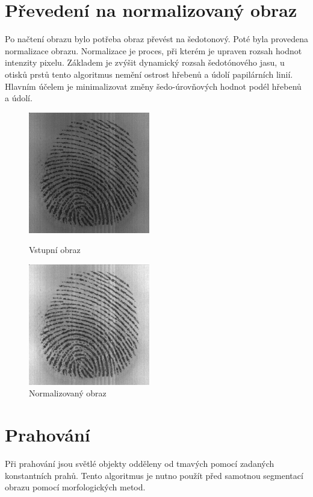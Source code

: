 \section{Převedení na normalizovaný obraz}
Po načtení obrazu bylo potřeba obraz převést na šedotonový. Poté byla provedena normalizace obrazu. Normalizace je proces, při kterém je upraven rozsah hodnot intenzity pixelu. Základem je zvýšit dynamický rozsah šedotónového jasu, u otisků prstů tento algoritmus nemění ostrost hřebenů a údolí papilárních linií. Hlavním účelem je minimalizovat změny šedo-úrovňových hodnot podél hřebenů a údolí. 

\begin{figure}[htbp]
  \begin{minipage}[b]{0.5\linewidth}
    \centering
    \includegraphics[width=200px]{obrazky-figures/102_1.png}
    \caption{Vstupní obraz}
  \end{minipage}
  \hspace{0.5cm}
  \begin{minipage}[b]{0.5\linewidth}
    \centering
    \includegraphics[width=200px]{obrazky-figures/norm_img.png}
    \caption{Normalizovaný obraz}
  \end{minipage}
\end{figure}



\section{Prahování}
Při prahování jsou světlé objekty odděleny od tmavých pomocí zadaných konstantních prahů. Tento algoritmus je nutno použít před samotnou segmentací obrazu pomocí morfologických metod.

